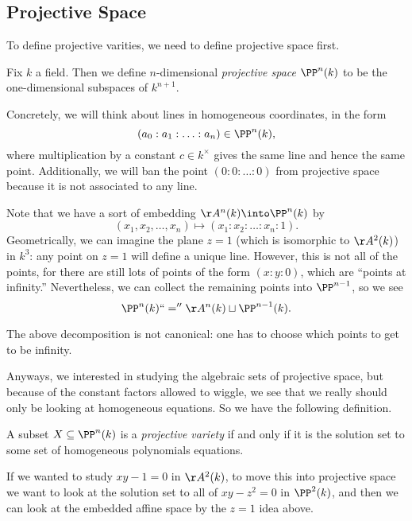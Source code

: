 \subsection{Projective Space}
To define projective varities, we need to define projective space first.
\begin{definition}
	Fix $k$ a field. Then we define $n$-dimensional \textit{projective space} $\PP^n(k)$ to be the one-dimensional subspaces of $k^{n+1}$.
\end{definition}
Concretely, we will think about lines in homogeneous coordinates, in the form
\[(a_0:a_1:\ldots:a_n)\in\PP^n(k),\]
where multiplication by a constant $c\in k^\times$ gives the same line and hence the same point. Additionally, we will ban the point $(0:0:\ldots:0)$ from projective space because it is not associated to any line.

Note that we have a sort of embedding $\AA^n(k)\into\PP^n(k)$ by
\[(x_1,x_2,\ldots,x_n)\mapsto(x_1:x_2:\ldots:x_n:1).\]
Geometrically, we can imagine the plane $z=1$ (which is isomorphic to $\AA^2(k)$) in $k^3$: any point on $z=1$ will define a unique line. However, this is not all of the points, for there are still lots of points of the form $(x:y:0)$, which are ``points at infinity.'' Nevertheless, we can collect the remaining points into $\PP^{n-1}$, so we see
\[\PP^n(k)``=''\AA^n(k)\sqcup\PP^{n-1}(k).\]
\begin{remark}
	The above decomposition is not canonical: one has to choose which points to get to be infinity.
\end{remark}

Anyways, we interested in studying the algebraic sets of projective space, but because of the constant factors allowed to wiggle, we see that we really should only be looking at homogeneous equations. So we have the following definition.
\begin{definition}
	A subset $X\subseteq\PP^n(k)$ is a \textit{projective variety} if and only if it is the solution set to some set of homogeneous polynomials equations.
\end{definition}
\begin{example}
	If we wanted to study $xy-1=0$ in $\AA^2(k)$, to move this into projective space we want to look at the solution set to all of $xy-z^2=0$ in $\PP^2(k)$, and then we can look at the embedded affine space by the $z=1$ idea above.
\end{example}

